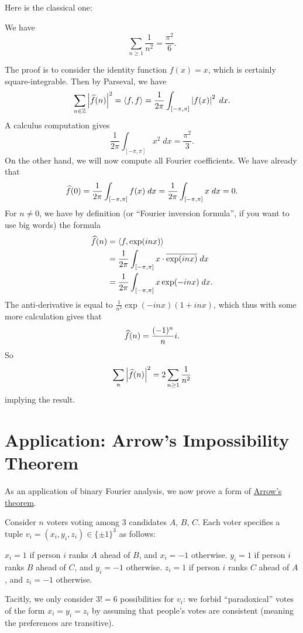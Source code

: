 Here is the classical one:
\begin{theorem}
	We have
	\[ \sum_{n \ge 1} \frac{1}{n^2} = \frac{\pi^2}{6}. \]
\end{theorem}
The proof is to consider the identity function $f(x) = x$,
which is certainly square-integrable.
Then by Parseval, we have
\[
	\sum_{n \in \mathbb Z} \left\lvert \widehat f(n) \right\rvert^2
	= \left< f,f\right>
	= \frac{1}{2\pi} \int_{[-\pi, \pi]} \left\lvert f(x) \right\rvert^2 \; dx.
\]
A calculus computation gives
\[  \frac{1}{2\pi} \int_{[-\pi, \pi]} x^2 \; dx = \frac{\pi^2}{3}. \]
On the other hand, we will now compute all Fourier coefficients.
We have already that
\[ \widehat f(0) = \frac{1}{2\pi} \int_{[-\pi, \pi]} f(x) \; dx
	= \frac{1}{2\pi} \int_{[-\pi, \pi]} x \; dx = 0. \]
For $n \neq 0$, we have by definition
(or ``Fourier inversion formula'', if you want to use big words)
the formula
\begin{align*}
	\widehat f(n) &= \left< f, \exp(inx) \right> \\
	&= \frac{1}{2\pi} \int_{[-\pi, \pi]} x \cdot \overline{\exp(inx)} \; dx \\
	&= \frac{1}{2\pi} \int_{[-\pi, \pi]} x \exp(-inx) \; dx.
\end{align*}
The anti-derivative is equal to
$\frac{1}{n^2} \exp(-inx) (1+inx)$,
which thus with some more calculation gives that
\[ \widehat f(n) = \frac{(-1)^n}{n} i. \]
So
\[ \sum_n \left\lvert \widehat f(n) \right\rvert^2
	= 2 \sum_{n \ge 1} \frac{1}{n^2} \]
implying the result.

\section{Application: Arrow's Impossibility Theorem}
As an application of binary Fourier analysis,
we now prove a form of
\href{https://en.wikipedia.org/wiki/Arrow's_impossibility_theorem}{Arrow's theorem}.

Consider $n$ voters voting among $3$ candidates $A$, $B$, $C$.
Each voter specifies a tuple $v_i = (x_i, y_i, z_i) \in \{\pm1\}^3$ as follows:
\begin{itemize}
	\ii $x_i = 1$ if person $i$ ranks $A$ ahead of $B$, and $x_i = -1$ otherwise.
	\ii $y_i = 1$ if person $i$ ranks $B$ ahead of $C$, and $y_i = -1$ otherwise.
	\ii $z_i = 1$ if person $i$ ranks $C$ ahead of $A$, and $z_i = -1$ otherwise.
\end{itemize}
Tacitly, we only consider $3! = 6$ possibilities for $v_i$:
we forbid ``paradoxical'' votes of the form $x_i = y_i = z_i$
by assuming that people's votes are consistent
(meaning the preferences are transitive).


